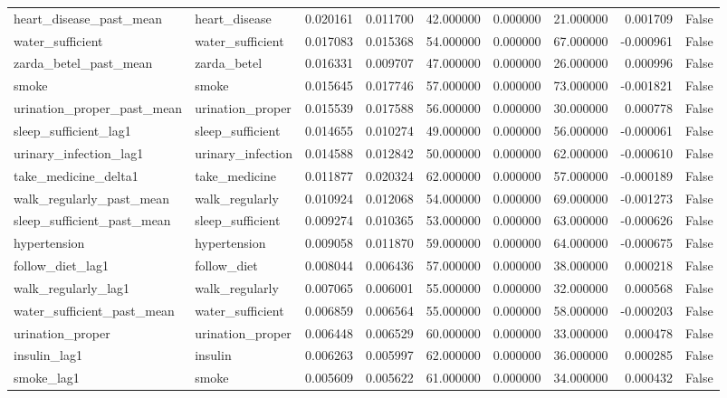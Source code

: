 \begin{longtable}{llrrrrrrr}
heart\_disease\_past\_mean & heart\_disease & 0.020161 & 0.011700 & 42.000000 & 0.000000 & 21.000000 & 0.001709 & False \\
water\_sufficient & water\_sufficient & 0.017083 & 0.015368 & 54.000000 & 0.000000 & 67.000000 & -0.000961 & False \\
zarda\_betel\_past\_mean & zarda\_betel & 0.016331 & 0.009707 & 47.000000 & 0.000000 & 26.000000 & 0.000996 & False \\
smoke & smoke & 0.015645 & 0.017746 & 57.000000 & 0.000000 & 73.000000 & -0.001821 & False \\
urination\_proper\_past\_mean & urination\_proper & 0.015539 & 0.017588 & 56.000000 & 0.000000 & 30.000000 & 0.000778 & False \\
sleep\_sufficient\_lag1 & sleep\_sufficient & 0.014655 & 0.010274 & 49.000000 & 0.000000 & 56.000000 & -0.000061 & False \\
urinary\_infection\_lag1 & urinary\_infection & 0.014588 & 0.012842 & 50.000000 & 0.000000 & 62.000000 & -0.000610 & False \\
take\_medicine\_delta1 & take\_medicine & 0.011877 & 0.020324 & 62.000000 & 0.000000 & 57.000000 & -0.000189 & False \\
walk\_regularly\_past\_mean & walk\_regularly & 0.010924 & 0.012068 & 54.000000 & 0.000000 & 69.000000 & -0.001273 & False \\
sleep\_sufficient\_past\_mean & sleep\_sufficient & 0.009274 & 0.010365 & 53.000000 & 0.000000 & 63.000000 & -0.000626 & False \\
hypertension & hypertension & 0.009058 & 0.011870 & 59.000000 & 0.000000 & 64.000000 & -0.000675 & False \\
follow\_diet\_lag1 & follow\_diet & 0.008044 & 0.006436 & 57.000000 & 0.000000 & 38.000000 & 0.000218 & False \\
walk\_regularly\_lag1 & walk\_regularly & 0.007065 & 0.006001 & 55.000000 & 0.000000 & 32.000000 & 0.000568 & False \\
water\_sufficient\_past\_mean & water\_sufficient & 0.006859 & 0.006564 & 55.000000 & 0.000000 & 58.000000 & -0.000203 & False \\
urination\_proper & urination\_proper & 0.006448 & 0.006529 & 60.000000 & 0.000000 & 33.000000 & 0.000478 & False \\
insulin\_lag1 & insulin & 0.006263 & 0.005997 & 62.000000 & 0.000000 & 36.000000 & 0.000285 & False \\
smoke\_lag1 & smoke & 0.005609 & 0.005622 & 61.000000 & 0.000000 & 34.000000 & 0.000432 & False \\

\end{longtable}

